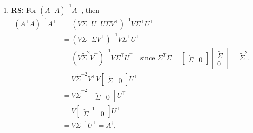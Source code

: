 \begin{intuition}
\begin{enumerate}
        \item \textbf{RS:} For \( (A^\top A)^{-1} A^\top \), then
        \begin{align*}
            (A^\top A)^{-1} A^\top 
            &= \left(V \Sigma^\top U^\top U \Sigma V^\top \right)^{-1} V \Sigma^\top U^\top \\
            &= \left(V \Sigma^\top \Sigma V^\top \right)^{-1} V \Sigma^\top U^\top \\
            &= \left(V \tilde{\Sigma}^2 V^\top \right)^{-1} V \Sigma^\top U^\top \quad  \text{since } \Sigma^T \Sigma = 
            \begin{bmatrix}
            \tilde{\Sigma} & 0
            \end{bmatrix}
            \begin{bmatrix}
            \tilde{\Sigma} \\
            0
            \end{bmatrix}
            =
            \tilde{\Sigma}^2.\\
            &= V \tilde{\Sigma}^{-2} V^\top V 
            \begin{bmatrix}
            \tilde{\Sigma} & 0
            \end{bmatrix}
            U^\top \\
            &= V \tilde{\Sigma}^{-2} 
            \begin{bmatrix}
            \tilde{\Sigma} & 0
            \end{bmatrix}
            U^\top \\
            &= V 
            \begin{bmatrix}
            \tilde{\Sigma}^{-1} & 0
            \end{bmatrix}
            U^\top \\
            &= V \Sigma^{-1} U^\top = A^\dagger,
        \end{align*}
    \end{enumerate}

\end{intuition}

